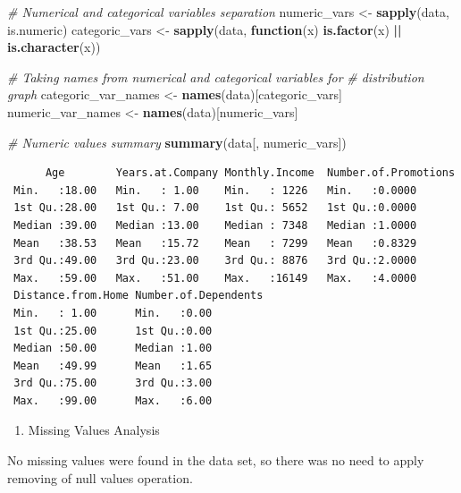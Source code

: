 \documentclass[
  10pt,
  paper=a4,
  ,captions=tableheading
]{scrartcl}
\newenvironment{Shaded}{\begin{snugshade}}{\end{snugshade}}
\newcommand{\CommentTok}[1]{\textcolor[rgb]{0.56,0.35,0.01}{\textit{#1}}}
\newcommand{\ControlFlowTok}[1]{\textcolor[rgb]{0.13,0.29,0.53}{\textbf{#1}}}
\newcommand{\FunctionTok}[1]{\textcolor[rgb]{0.13,0.29,0.53}{\textbf{#1}}}
\newcommand{\NormalTok}[1]{#1}
\newcommand{\OtherTok}[1]{\textcolor[rgb]{0.56,0.35,0.01}{#1}}
\newcommand{\SpecialCharTok}[1]{\textcolor[rgb]{0.81,0.36,0.00}{\textbf{#1}}}
\providecommand{\tightlist}{%
  \setlength{\itemsep}{0pt}\setlength{\parskip}{0pt}}
\begin{document}
\small

\begin{Shaded}
\begin{Highlighting}[]
\CommentTok{\# Numerical and categorical variables separation}
\NormalTok{numeric\_vars }\OtherTok{\textless{}{-}} \FunctionTok{sapply}\NormalTok{(data, is.numeric)}
\NormalTok{categoric\_vars }\OtherTok{\textless{}{-}} \FunctionTok{sapply}\NormalTok{(data, }\ControlFlowTok{function}\NormalTok{(x) }\FunctionTok{is.factor}\NormalTok{(x) }\SpecialCharTok{||} \FunctionTok{is.character}\NormalTok{(x))}

\CommentTok{\# Taking names from numerical and categorical variables for}
\CommentTok{\# distribution graph}
\NormalTok{categoric\_var\_names }\OtherTok{\textless{}{-}} \FunctionTok{names}\NormalTok{(data)[categoric\_vars]}
\NormalTok{numeric\_var\_names }\OtherTok{\textless{}{-}} \FunctionTok{names}\NormalTok{(data)[numeric\_vars]}

\CommentTok{\# Numeric values summary}
\FunctionTok{summary}\NormalTok{(data[, numeric\_vars])}
\end{Highlighting}
\end{Shaded}

\begin{verbatim}
      Age        Years.at.Company Monthly.Income  Number.of.Promotions
 Min.   :18.00   Min.   : 1.00    Min.   : 1226   Min.   :0.0000      
 1st Qu.:28.00   1st Qu.: 7.00    1st Qu.: 5652   1st Qu.:0.0000      
 Median :39.00   Median :13.00    Median : 7348   Median :1.0000      
 Mean   :38.53   Mean   :15.72    Mean   : 7299   Mean   :0.8329      
 3rd Qu.:49.00   3rd Qu.:23.00    3rd Qu.: 8876   3rd Qu.:2.0000      
 Max.   :59.00   Max.   :51.00    Max.   :16149   Max.   :4.0000      
 Distance.from.Home Number.of.Dependents
 Min.   : 1.00      Min.   :0.00        
 1st Qu.:25.00      1st Qu.:0.00        
 Median :50.00      Median :1.00        
 Mean   :49.99      Mean   :1.65        
 3rd Qu.:75.00      3rd Qu.:3.00        
 Max.   :99.00      Max.   :6.00        
\end{verbatim}

\small

\begin{enumerate}
\def\labelenumi{\arabic{enumi}.}
\setcounter{enumi}{2}
\tightlist
\item
  Missing Values Analysis
\end{enumerate}

No missing values were found in the data set, so there was no need to
apply removing of null values operation.
\end{document}
